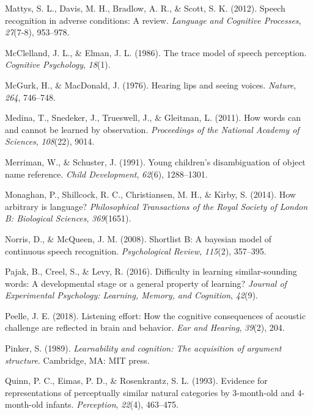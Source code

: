 \documentclass[english,,man,floatsintext]{apa6}
\theoremstyle{definition}
\theoremstyle{definition}
\theoremstyle{definition}
\theoremstyle{remark}
\begin{document}
\hypertarget{ref-mattys12}{}
Mattys, S. L., Davis, M. H., Bradlow, A. R., \& Scott, S. K. (2012).
Speech recognition in adverse conditions: A review. \emph{Language and
Cognitive Processes}, \emph{27}(7-8), 953--978.

\hypertarget{ref-mcclelland1986}{}
McClelland, J. L., \& Elman, J. L. (1986). The trace model of speech
perception. \emph{Cognitive Psychology}, \emph{18}(1).

\hypertarget{ref-mcgurk1976}{}
McGurk, H., \& MacDonald, J. (1976). Hearing lips and seeing voices.
\emph{Nature}, \emph{264}, 746--748.

\hypertarget{ref-medina2011}{}
Medina, T., Snedeker, J., Trueswell, J., \& Gleitman, L. (2011). How
words can and cannot be learned by observation. \emph{Proceedings of the
National Academy of Sciences}, \emph{108}(22), 9014.

\hypertarget{ref-Merriman91}{}
Merriman, W., \& Schuster, J. (1991). Young children's disambiguation of
object name reference. \emph{Child Development}, \emph{62}(6),
1288--1301.

\hypertarget{ref-Monaghan2014}{}
Monaghan, P., Shillcock, R. C., Christiansen, M. H., \& Kirby, S.
(2014). How arbitrary is language? \emph{Philosophical Transactions of
the Royal Society of London B: Biological Sciences}, \emph{369}(1651).

\hypertarget{ref-Norris08}{}
Norris, D., \& McQueen, J. M. (2008). Shortlist B: A bayesian model of
continuous speech recognition. \emph{Psychological Review},
\emph{115}(2), 357--395.

\hypertarget{ref-pajak2016}{}
Pajak, B., Creel, S., \& Levy, R. (2016). Difficulty in learning
similar-sounding words: A developmental stage or a general property of
learning? \emph{Journal of Experimental Psychology: Learning, Memory,
and Cognition}, \emph{42}(9).

\hypertarget{ref-peelle2018}{}
Peelle, J. E. (2018). Listening effort: How the cognitive consequences
of acoustic challenge are reflected in brain and behavior. \emph{Ear and
Hearing}, \emph{39}(2), 204.

\hypertarget{ref-pinker1989}{}
Pinker, S. (1989). \emph{Learnability and cognition: The acquisition of
argument structure}. Cambridge, MA: MIT press.

\hypertarget{ref-quinn93}{}
Quinn, P. C., Eimas, P. D., \& Rosenkrantz, S. L. (1993). Evidence for
representations of perceptually similar natural categories by
3-month-old and 4-month-old infants. \emph{Perception}, \emph{22}(4),
463--475.
\end{document}
